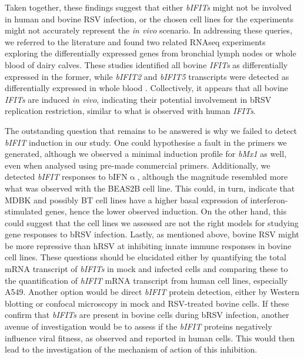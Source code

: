 Taken together, these findings suggest that either \textit{bIFITs} might not be involved in human and bovine RSV infection, or the chosen cell lines for the experiments might not accurately represent the \textit{in vivo} scenario. In addressing these queries, we referred to the literature and found two related RNAseq experiments exploring the differentially expressed genes from bronchial lymph nodes or whole blood of dairy calves. These studies identified all bovine \textit{IFITs} as differentially expressed in the former, while \textit{bIFIT2} and \textit{bIFIT5} transcripts were detected as differentially expressed in whole blood \cite{Johnston2019ExperimentalResponse., Johnston2021MessengerCalves}. Collectively, it appears that all bovine \textit{IFITs} are induced \textit{in vivo}, indicating their potential involvement in bRSV replication restriction, similar to what is observed with human \textit{IFITs}.

The outstanding question that remains to be answered is why we failed to detect \textit{bIFIT} induction in our study. One could hypothesise a fault in the primers we generated, although we observed a minimal induction profile for \textit{bMx1} as well, even when analysed using pre-made commercial primers. Additionally, we detected \textit{bIFIT} responses to bIFN$\upalpha$, although the magnitude resembled more what was observed with the BEAS2B cell line. This could, in turn, indicate that MDBK and possibly BT cell lines have a higher basal expression of interferon-stimulated genes, hence the lower observed induction. On the other hand, this could suggest that the cell lines we assessed are not the right models for studying gene responses to bRSV infection. Lastly, as mentioned above, bovine RSV might be more repressive than hRSV at inhibiting innate immune responses in bovine cell lines. These questions should be elucidated either by quantifying the total mRNA transcript of \textit{bIFITs} in mock and infected cells and comparing these to the quantification of \textit{hIFIT} mRNA transcript from human cell lines, especially A549. Another option would be direct \textit{bIFIT} protein detection, either by Western blotting or confocal microscopy in mock and RSV-treated bovine cells. If these confirm that \textit{bIFITs} are present in bovine cells during bRSV infection, another avenue of investigation would be to assess if the \textit{bIFIT} proteins negatively influence viral fitness, as observed and reported in human cells. This would then lead to the investigation of the mechanism of action of this inhibition.

